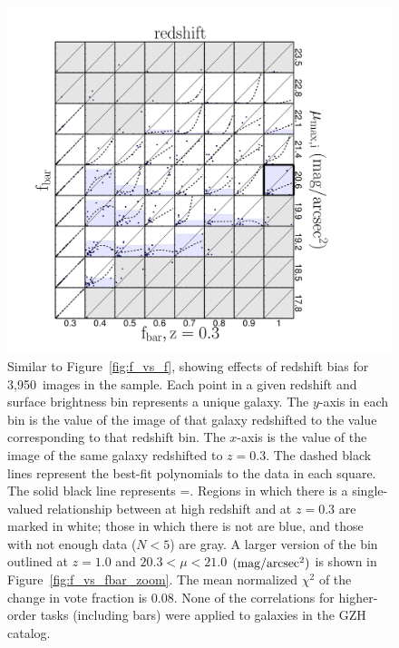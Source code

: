 \documentclass[twocolumn]{aastex6}
\begin{document}
\begin{figure}
\centering
\includegraphics[width=\textwidth]{figures/p_vs_p_SB_redshift_bar.pdf}
\caption{Similar to Figure~\ref{fig:f_vs_f}, showing effects of redshift bias
for 3,950~images in the \ferengi{} sample. Each point in a given redshift
and surface brightness bin represents a unique galaxy. The $y$-axis in each
bin is the \ffeatures{} value of the image of that galaxy redshifted to the
value corresponding to that redshift bin. The $x$-axis is the \ffeatures{}
value of the image of the same galaxy redshifted to $z=0.3$. The dashed
black lines represent the best-fit polynomials to the data in each square.
The solid black line represents \ffeaturesz=\ffeaturesrest. Regions in
which there is a single-valued relationship between \ffeatures{} at high
redshift and at $z=0.3$ are marked in white; those in which there is not
are blue, and those with not enough data ($N<5$) are gray. A larger version of
the bin outlined at $z=1.0$ and $20.3 < \mu < 21.0$ $\rm (mag/arcsec^2)$ is
shown in Figure~\ref{fig:f_vs_fbar_zoom}. The mean normalized $\chi^2$ of the
change in vote fraction is 0.08. None of the correlations for higher-order
tasks (including bars) were applied to galaxies in the GZH catalog.}
\label{fig:f_vs_fbar}
\end{figure}
\end{document}
